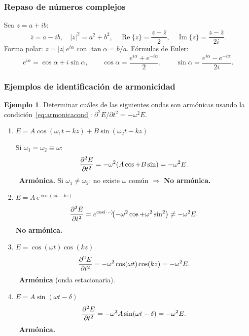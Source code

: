 \documentclass[12pt, a4paper]{article}
\theoremstyle{plain}
\theoremstyle{definition}
\newtheorem{ejemplo}{Ejemplo}[section]
\theoremstyle{remark}
\begin{document}
\subsubsection{Repaso de números complejos}

Sea $z = a + ib$:
\[
  \bar{z} = a-ib,\quad
  |z|^2 = a^2+b^2,\quad
  \operatorname{Re}\{z\} = \frac{z+\bar{z}}{2},\quad
  \operatorname{Im}\{z\} = \frac{z-\bar{z}}{2i}.
\]
Forma polar: $z = |z|\,e^{i\alpha}$ con $\tan\alpha = b/a$. Fórmulas de Euler:
\[
  e^{i\alpha} = \cos\alpha + i\sin\alpha, \qquad
  \cos\alpha = \frac{e^{i\alpha}+e^{-i\alpha}}{2}, \qquad
  \sin\alpha = \frac{e^{i\alpha}-e^{-i\alpha}}{2i}.
\]

\subsubsection{Ejemplos de identificación de armonicidad}

\begin{ejemplo}
Determinar cuáles de las siguientes ondas son armónicas usando la
condición~\eqref{eq:armonicacond}: $\partial^2E/\partial t^2 = -\omega^2 E$.

\begin{enumerate}

  \item $E = A\cos(\omega_1 t - kz) + B\sin(\omega_2 t - kz)$

  Si $\omega_1=\omega_2\equiv\omega$:
  \[
    \pdv[2]{E}{t} = -\omega^2(A\cos + B\sin) = -\omega^2 E.
  \]
  \checkmark\ \textbf{Armónica.} \quad
  Si $\omega_1\neq\omega_2$: no existe $\omega$ común $\Rightarrow$ \textbf{No armónica.}

  \item $E = A\,e^{\cos(\omega t-kz)}$
  \[
    \pdv[2]{E}{t} = e^{\cos(\cdots)}\!\bigl(-\omega^2\cos + \omega^2\sin^2\bigr)
    \neq -\omega^2 E.
  \]
  \textbf{No armónica.}

  \item $E = \cos(\omega t)\cos(kz)$
  \[
    \pdv[2]{E}{t} = -\omega^2\cos(\omega t)\cos(kz) = -\omega^2 E.
  \]
  \checkmark\ \textbf{Armónica} (onda estacionaria).

  \item $E = A\sin(\omega t - \delta)$
  \[
    \pdv[2]{E}{t} = -\omega^2 A\sin(\omega t-\delta) = -\omega^2 E.
  \]
  \checkmark\ \textbf{Armónica.}

\end{enumerate}
\end{ejemplo}
\end{document}
